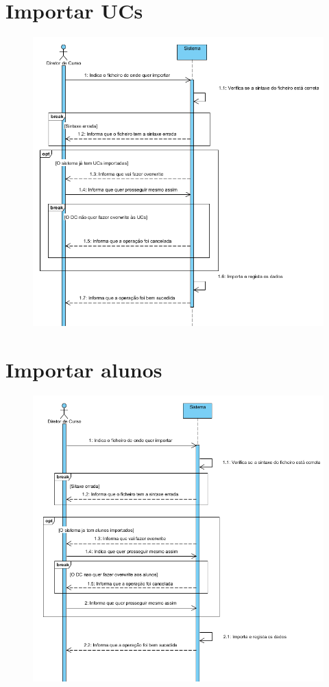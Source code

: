 \documentclass[12pt,a4paper]{report}
\begin{document}
\begin{appendices}
\section{Importar UCs}
\begin{figure}[H]
	\centering 
	\includegraphics[width=\textwidth]{modelacao/use_case_diagram/importarUCs.png}  
\end{figure}

\section{Importar alunos}
\begin{figure}[H]
	\centering 
	\includegraphics[width=\textwidth]{modelacao/use_case_diagram/importaralunos.png}  
\end{figure}


\end{appendices}
\end{document}

